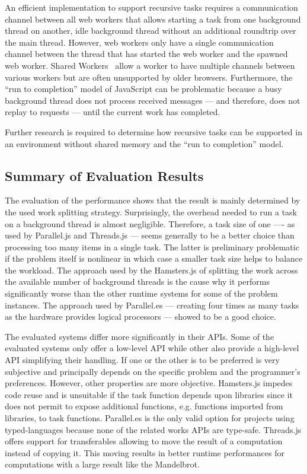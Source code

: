 An efficient implementation to support recursive tasks requires a communication channel between all web workers that allows starting a task from one background thread on another, idle background thread without an additional roundtrip over the main thread. However, web workers only have a single communication channel between the thread that has started the web worker and the spawned web worker. Shared Workers~\cite[section 4.6.4]{w3cWebWorker} allow a worker to have multiple channels between various workers but are often unsupported by older browsers. Furthermore, the \enquote{run to completion} model of JavaScript can be problematic because a busy background thread does not process received messages --- and therefore, does not replay to requests --- until the current work has completed.

Further research is required to determine how recursive tasks can be supported in an environment without shared memory and the \enquote{run to completion} model.

\subsection{Summary of Evaluation Results}
The evaluation of the performance shows that the result is mainly determined by the used work splitting strategy. Surprisingly, the overhead needed to run a task on a background thread is almost negligible. Therefore, a task size of one  ---- as used by Parallel.js and Threads.js --- seems generally to be a better choice than processing too many items in a single task. The latter is preliminary problematic if the problem itself is nonlinear in which case a smaller task size helps to balance the workload. The approach used by the Hamsters.js of splitting the work across the available number of background threads is the cause why it performs significantly worse than the other runtime systems for some of the problem instances. The approach used by Parallel.es --- creating four times as many tasks as the hardware provides logical processors --- showed to be a good choice. 

The evaluated systems differ more significantly in their APIs. Some of the evaluated systems only offer a low-level API while other also provide a high-level API simplifying their handling. If one or the other is to be preferred is very subjective and principally depends on the specific problem and the programmer's preferences. However, other properties are more objective. Hamsters.js impedes code reuse and is unsuitable if the task function depends upon libraries since it does not permit to expose additional functions, e.g. functions imported from libraries, to task functions. Parallel.es is the only valid option for projects using typed-languages because none of the related works APIs are type-safe. Threads.js offers support for transferables allowing to move the result of a computation instead of copying it. This moving results in better runtime performances for computations with a large result like the Mandelbrot.


